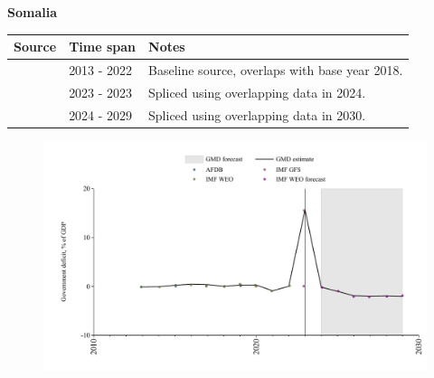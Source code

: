 \documentclass[12pt,a4paper,landscape]{article}
\begin{document}
\begin{adjustbox}{max totalsize={\paperwidth}{\paperheight},center}
\begin{minipage}[t][\textheight][t]{\textwidth}
\vspace*{0.5cm}
{}
\begin{center}
{\Large\bfseries Somalia}
\end{center}
\vspace{0.5cm}
\begin{table}[H]
\centering
\small
\begin{tabular}{|l|l|l|}
\hline
\textbf{Source} & \textbf{Time span} & \textbf{Notes} \\
\hline
\rowcolor{white}\cite{IMF_WEO}& 2013 - 2022 &Baseline source, overlaps with base year 2018.\\
\rowcolor{lightgray}\cite{IMF_GFS}& 2023 - 2023 &Spliced using overlapping data in 2024.\\
\rowcolor{white}\cite{IMF_WEO_forecast}& 2024 - 2029 &Spliced using overlapping data in 2030.\\
\hline
\end{tabular}
\end{table}
\begin{figure}[H]
\centering
\includegraphics[width=\textwidth,height=0.6\textheight,keepaspectratio]{graphs/SOM_govdef_GDP.pdf}
\end{figure}
\end{minipage}
\end{adjustbox}
\end{document}
